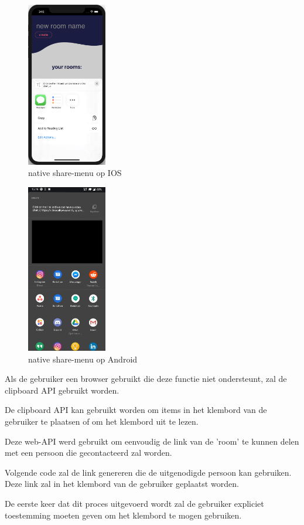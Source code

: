 		\begin{figure}[H]
			\centering
			\includegraphics[width=35mm]{./img/share-ios}{}
			\caption{native share-menu op IOS}
		\end{figure}	
		\begin{figure}[H]
			\centering
			\includegraphics[width=35mm]{./img/share-android.jpg}{}
			\caption{native share-menu op Android}
		\end{figure}

		Als de gebruiker een browser gebruikt die deze functie niet ondersteunt, zal de clipboard API gebruikt worden.
	
		De clipboard API kan gebruikt worden om items in het klembord van de gebruiker te plaatsen of om het klembord uit te lezen.
		
		Deze web-API werd gebruikt om eenvoudig de link van de 'room' te kunnen delen met een persoon die gecontacteerd zal worden.
		
		Volgende code zal de link genereren die de uitgenodigde persoon kan gebruiken. Deze link zal in het klembord van de gebruiker geplaatst worden.
		
		De eerste keer dat dit proces uitgevoerd wordt zal de gebruiker expliciet toestemming moeten geven om het klembord te mogen gebruiken.

